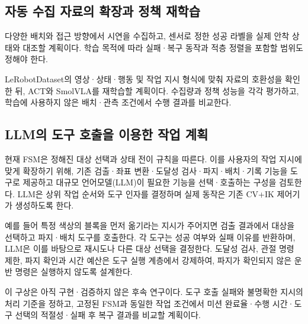\subsection{자동 수집 자료의 확장과 정책 재학습}
\label{sec:dataset-extension}
다양한 배치와 접근 방향에서 시연을 수집하고, 센서로 정한 성공 라벨을 실제 안착 상태와 대조할 계획이다. 학습 목적에 따라 실패·복구 동작과 적층 정렬을 포함할 범위도 정해야 한다.

LeRobotDataset의 영상·상태·행동 및 작업 지시 형식에 맞춰 자료의 호환성을 확인한 뒤\cite{lerobot-dataset}, ACT와 SmolVLA를 재학습할 계획이다\cite{act,smolvla}. 수집량과 정책 성능을 각각 평가하고, 학습에 사용하지 않은 배치·관측 조건에서 수행 결과를 비교한다.

\subsection{LLM의 도구 호출을 이용한 작업 계획}
현재 FSM은 정해진 대상 선택과 상태 전이 규칙을 따른다. 이를 사용자의 작업 지시에 맞게 확장하기 위해, 기존 검출·좌표 변환·도달성 검사·파지·배치·기록 기능을 도구로 제공하고 대규모 언어모델(LLM)이 필요한 기능을 선택·호출하는 구성을 검토한다. LLM은 상위 작업 순서와 도구 인자를 결정하며 실제 동작은 기존 CV+IK 제어기가 생성하도록 한다.

예를 들어 특정 색상의 블록을 먼저 옮기라는 지시가 주어지면 검출 결과에서 대상을 선택하고 파지·배치 도구를 호출한다. 각 도구는 성공 여부와 실패 이유를 반환하며, LLM은 이를 바탕으로 재시도나 다른 대상 선택을 결정한다. 도달성 검사, 관절 명령 제한, 파지 확인과 시간 예산은 도구 실행 계층에서 강제하여, 파지가 확인되지 않은 운반 명령은 실행하지 않도록 설계한다.

이 구상은 아직 구현·검증하지 않은 후속 연구이다. 도구 호출 실패와 불명확한 지시의 처리 기준을 정하고, 고정된 FSM과 동일한 작업 조건에서 미션 완료율·수행 시간·도구 선택의 적절성·실패 후 복구 결과를 비교할 계획이다.
\FloatBarrier
